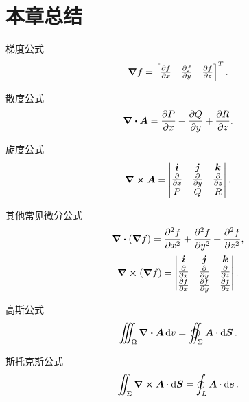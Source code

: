 \section{本章总结}
梯度公式\[
	\grad f
	= \begin{bmatrix}
		\pdv{f}{x} & \pdv{f}{y} & \pdv{f}{z}
	\end{bmatrix}^T.
\]

散度公式\[
	\div{\boldsymbol{A}}
	= \pdv{P}{x}+\pdv{Q}{y}+\pdv{R}{z}.
\]

旋度公式\[
	\curl{\boldsymbol{A}}
	= \begin{vmatrix}
		\boldsymbol{i} & \boldsymbol{j} & \boldsymbol{k} \\
		\pdv{x} & \pdv{y} & \pdv{z} \\
		P & Q & R
	\end{vmatrix}.
\]

其他常见微分公式\begin{gather*}
	\div(\grad f)
	= \pdv[2]{f}{x} + \pdv[2]{f}{y} + \pdv[2]{f}{z}, \\
	\curl(\grad f)
	= \begin{vmatrix}
		\boldsymbol{i} & \boldsymbol{j} & \boldsymbol{k} \\
		\pdv{x} & \pdv{y} & \pdv{z} \\
		\pdv{f}{x} & \pdv{f}{y} & \pdv{f}{z}
	\end{vmatrix}.
\end{gather*}

高斯公式\[
	\iiint_\Omega \div{\vb{A}} \dd{v}
	= \varoiint_\Sigma \vb{A} \cdot \dd{\vb{S}}.
\]

斯托克斯公式\[
	\iint_\Sigma \curl{\boldsymbol{A}} \cdot \dd{\boldsymbol{S}}
	= \oint_L \boldsymbol{A} \cdot \dd{\boldsymbol{s}}.
\]
